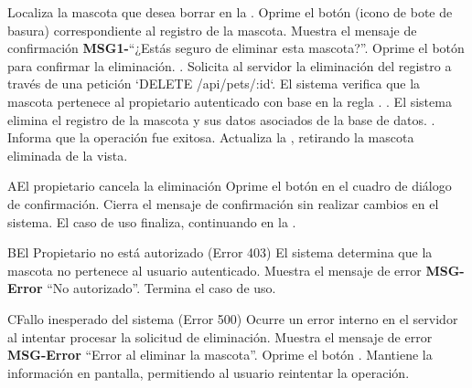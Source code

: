 \begin{UCtrayectoria}
	\UCpaso[\UCactor] Localiza la mascota que desea borrar en la . \label{CU02-LocatePet}
	\UCpaso[\UCactor] Oprime el botón  (icono de bote de basura) correspondiente al registro de la mascota.
	\UCpaso Muestra el mensaje de confirmación {\bf MSG1-}``¿Estás seguro de eliminar esta mascota?''.
	\UCpaso[\UCactor] Oprime el botón  para confirmar la eliminación. .
	\UCpaso Solicita al servidor la eliminación del registro a través de una petición `DELETE /api/pets/:id`.
	\UCpaso El sistema verifica que la mascota pertenece al propietario autenticado con base en la regla . .
	\UCpaso El sistema elimina el registro de la mascota y sus datos asociados de la base de datos. .
	\UCpaso Informa que la operación fue exitosa.
	\UCpaso Actualiza la , retirando la mascota eliminada de la vista.
\end{UCtrayectoria}


\begin{UCtrayectoriaA}{A}{El propietario cancela la eliminación}
	\UCpaso[\UCactor] Oprime el botón  en el cuadro de diálogo de confirmación.
	\UCpaso Cierra el mensaje de confirmación sin realizar cambios en el sistema.
	\UCpaso[] El caso de uso finaliza, continuando en la .
\end{UCtrayectoriaA}

\begin{UCtrayectoriaA}{B}{El Propietario no está autorizado (Error 403)}
	\UCpaso El sistema determina que la mascota no pertenece al usuario autenticado.
	\UCpaso Muestra el mensaje de error {\bf MSG-Error} ``No autorizado''.
	\UCpaso[] Termina el caso de uso.
\end{UCtrayectoriaA}

\begin{UCtrayectoriaA}{C}{Fallo inesperado del sistema (Error 500)}
	\UCpaso Ocurre un error interno en el servidor al intentar procesar la solicitud de eliminación.
	\UCpaso Muestra el mensaje de error {\bf MSG-Error} ``Error al eliminar la mascota''.
	\UCpaso[\UCactor] Oprime el botón .
	\UCpaso Mantiene la información en pantalla, permitiendo al usuario reintentar la operación.
\end{UCtrayectoriaA}

